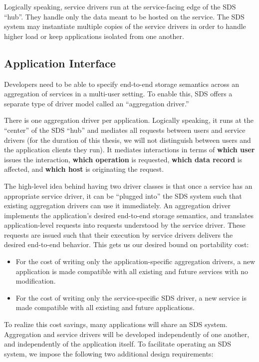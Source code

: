 Logically speaking, service drivers run at the service-facing edge of the SDS ``hub''.  They
handle only the data meant to be hosted on the service.  The SDS system may
instantiate multiple copies of the service drivers in order to handle higher
load or keep applications isolated from one another.

\subsection{Application Interface}

Developers need to be able to specify
end-to-end storage semantics across an aggregation of services
in a multi-user setting.  To enable this,
SDS offers a separate type of driver model called an ``aggregation
driver.''

There is one aggregation driver per application.  Logically speaking, it runs at
the ``center'' of the SDS ``hub'' and mediates all requests between users and
service drivers (for the duration of this thesis, we will not
distinguish between users and the application clients
they run).  It mediates interactions in terms of \textbf{which user} issues the
interaction, \textbf{which operation} is requested, \textbf{which data
record} is affected, and \textbf{which host} is originating the request.

The high-level idea behind having two driver classes is that once a service has an appropriate service driver,
it can be ``plugged into'' the SDS system such that existing aggregation drivers
can use it immediately.  An aggregation driver implements the application's desired end-to-end storage
semantics, and translates
application-level requests into requests understood by the service driver.  These
requests are issued such that their execution
by service drivers delivers the desired end-to-end behavior.  This gets us our
desired bound on portability cost:

\begin{itemize}
    \item For the cost of writing only the application-specific
aggregation drivers, a new application is made
compatible with all existing and future services with no modification.
    \item For the cost of writing only the service-specific SDS driver, a new
service is made compatible with all existing and future applications.
\end{itemize}

To realize this cost savings, many applications will share an SDS system.  Aggregation and service drivers
will be developed independently of one another, and independently of the application itself.
To facilitate operating an SDS system, we impose the following two additional design
requirements:

